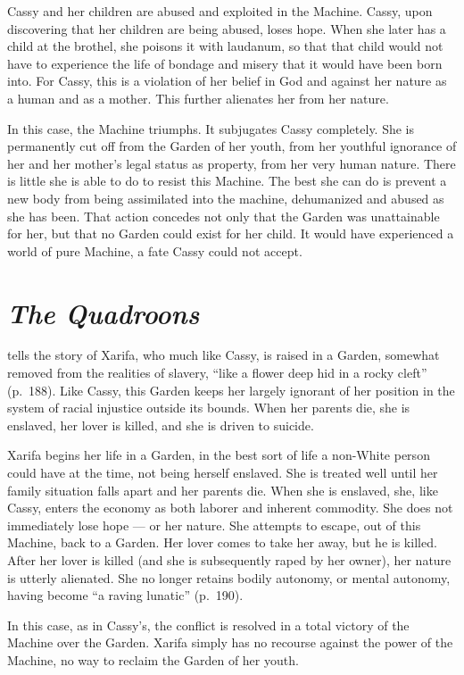 \documentclass[man,12pt,natbib]{apa6}
\begin{document}
Cassy and her children are abused and exploited in the Machine. Cassy, upon 
discovering that her children are being abused, loses hope. When she later 
has a child at the brothel, she poisons it with laudanum, so that that child
would not have to experience the life of bondage and misery that it would
have been born into. For Cassy, this is a violation of her belief in God
and against her nature as a human and as a mother. This further alienates 
her from her nature.

In this case, the Machine triumphs. It subjugates Cassy completely. She is
permanently cut off from the Garden of her youth, from her youthful ignorance
of her and her mother's legal status as property, from her very human nature.
There is little she is able to do to resist this Machine. The best she can do
is prevent a new body from being assimilated into the machine, dehumanized
and abused as she has been. That action concedes not only that the Garden was
unattainable for her, but that no Garden could exist for her child. It would
have experienced a world of pure Machine, a fate Cassy could not accept.


\section{\emph{The Quadroons}}

\citet{Child12a} tells the story of Xarifa, who much like Cassy, is raised in a
Garden, somewhat removed from the realities of slavery, ``like a flower deep
hid in a rocky cleft'' (p.~188). Like Cassy, this Garden keeps her largely
ignorant of her position in the system of racial injustice outside its bounds.
When her parents die, she is enslaved, her lover is killed, and she is driven
to suicide.

Xarifa begins her life in a Garden, in the best sort of life a non-White person
could have at the time, not being herself enslaved. She is treated well until
her family situation falls apart and her parents die. When she is enslaved,
she, like Cassy, enters the economy as both laborer and inherent commodity. She
does not immediately lose hope --- or her nature.  She attempts to escape, out
of this Machine, back to a Garden. Her lover comes to take her away, but he is
killed. After her lover is killed (and she is subsequently raped by her owner),
her nature is utterly alienated. She no longer retains bodily autonomy, or
mental autonomy, having become ``a raving lunatic'' (p.~190).

In this case, as in Cassy's, the conflict is resolved in a total victory of the
Machine over the Garden. Xarifa simply has no recourse against the power of the
Machine, no way to reclaim the Garden of her youth.
\end{document}
